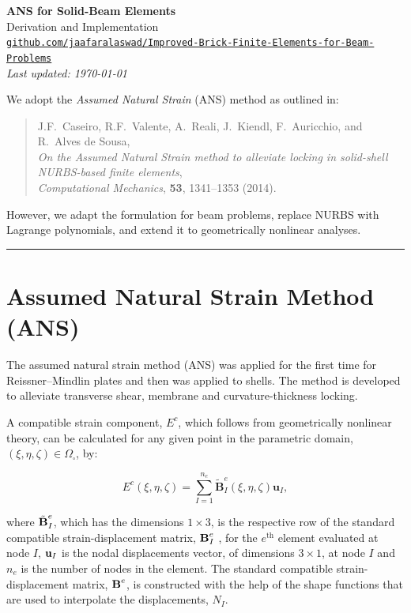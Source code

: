 \documentclass[12pt]{article}
\begin{document}
\begin{center}
    {\LARGE \textbf{ANS for Solid-Beam Elements}}\\[0.5em]
    {\large Derivation and Implementation}\\[1em]
    \href{https://github.com/jaafaralaswad/Improved-Brick-Finite-Elements-for-Beam-Problems}{\texttt{github.com/jaafaralaswad/Improved-Brick-Finite-Elements-for-Beam-Problems}}\\[1em]
    \textit{Last updated: \today}
\end{center}
\vspace{2em}

We adopt the \textit{Assumed Natural Strain} (ANS) method as outlined in:

\begin{quote}
J.F.~Caseiro, R.F.~Valente, A.~Reali, J.~Kiendl, F.~Auricchio, and R.~Alves de Sousa,\\
\textit{On the Assumed Natural Strain method to alleviate locking in solid-shell NURBS-based finite elements},\\
\textit{Computational Mechanics}, \textbf{53}, 1341–1353 (2014).
\end{quote}

However, we adapt the formulation for beam problems, replace NURBS with Lagrange polynomials, and extend it to geometrically nonlinear analyses.


\tableofcontents
\bigskip
\hrule
\bigskip


\section{Assumed Natural Strain Method (ANS)}

The assumed natural strain method (ANS) was applied for the first time for Reissner–Mindlin plates and then was applied to shells. The method is developed to alleviate transverse shear, membrane and curvature-thickness locking.

A compatible strain component, $E^c$, which follows from geometrically nonlinear theory, can be calculated for any given point in the parametric domain, $(\xi, \eta, \zeta) \in \Omega_{\square}$, by:

\begin{equation}
E^c (\xi, \eta, \zeta) = \sum_{I=1}^{n_e} \tilde{\mathbf{B}}^e_I (\xi, \eta, \zeta) \mathbf{u}_I,
\end{equation}

\noindent
where $\tilde{\text{\bf{B}}}^e_I$, which has the dimensions $1 \times 3$, is the respective row of the standard compatible strain-displacement matrix, $\text{\bf{B}}^e_I$ , for the $e^{\text{th}}$ element evaluated at node $I$, $\text{\bf{u}}_I$ is the nodal displacements vector, of dimensions $3 \times 1$, at node $I$ and $n_e$ is the number of nodes in the element. The standard compatible strain-displacement matrix, $\text{\bf{B}}^e$, is constructed with the help of the shape functions that are used to interpolate the displacements, $N_I$.
\end{document}
